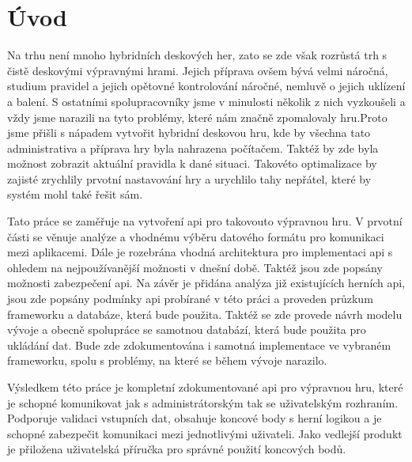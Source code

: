 \chapter{Úvod}
Na trhu není mnoho hybridních deskových her, zato se zde však rozrůstá trh s čistě deskovými výpravnými hrami. Jejich příprava ovšem bývá velmi náročná, studium pravidel a jejich opětovné kontrolování náročné, nemluvě o jejich uklízení a balení. S ostatními spolupracovníky jsme v minulosti několik z nich vyzkoušeli a vždy jsme narazili na tyto problémy, které nám značně zpomalovaly hru.Proto jsme přišli s nápadem vytvořit hybridní deskovou hru, kde by všechna tato administrativa a příprava hry byla nahrazena počítačem. Taktéž by zde byla možnost zobrazit aktuální pravidla k dané situaci. Takovéto optimalizace by zajisté zrychlily prvotní nastavování hry a urychlilo tahy nepřátel, které by systém mohl také řešit sám.

Tato práce se zaměřuje na vytvoření \gls{api} pro takovouto výpravnou hru. V prvotní části se věnuje analýze a vhodnému výběru datového formátu pro komunikaci mezi aplikacemi. Dále je rozebrána vhodná architektura pro implementaci \gls{api} s ohledem na nejpoužívanější možnosti v dnešní době. Taktéž jsou zde popsány možnosti zabezpečení \gls{api}. Na závěr je přidána analýza již existujících herních \gls{api}, jsou zde popsány podmínky \gls{api} probírané v této práci a proveden průzkum \gls{framework}u a databáze, která bude použita. Taktéž se zde provede návrh modelu vývoje a obecně spolupráce se samotnou databází, která bude použita pro ukládání dat. Bude zde zdokumentována i samotná implementace ve vybraném \gls{framework}u, spolu s problémy, na které se během vývoje narazilo.

Výsledkem této práce je kompletní zdokumentované \gls{api} pro výpravnou hru, které je schopné komunikovat jak s administrátorským tak se uživatelským rozhraním. Podporuje validaci vstupních dat, obsahuje koncové body s herní logikou a je schopné zabezpečit komunikaci mezi jednotlivými uživateli. Jako vedlejší produkt je přiložena uživatelská příručka pro správné použití koncových bodů.